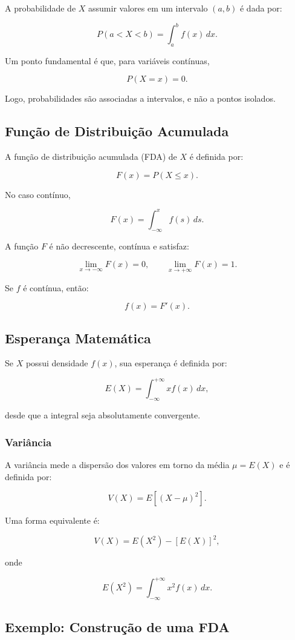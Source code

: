 A probabilidade de $X$ assumir valores em um intervalo $(a,b)$ é dada por:

\[
P(a<X<b)=\int_a^b f(x)\,dx.
\]

Um ponto fundamental é que, para variáveis contínuas,

\[
P(X=x)=0.
\]

Logo, probabilidades são associadas a intervalos, e não a pontos isolados.

\subsection{Função de Distribuição Acumulada}

A função de distribuição acumulada (FDA) de $X$ é definida por:

\[
F(x)=P(X\le x).
\]

No caso contínuo,

\[
F(x)=\int_{-\infty}^{x} f(s)\,ds.
\]

A função $F$ é não decrescente, contínua e satisfaz:

\[
\lim_{x\to -\infty}F(x)=0,
\qquad
\lim_{x\to +\infty}F(x)=1.
\]

Se $f$ é contínua, então:

\[
f(x)=F'(x).
\]

\subsection{Esperança Matemática}

Se $X$ possui densidade $f(x)$, sua esperança é definida por:

\[
E(X)=\int_{-\infty}^{+\infty} x f(x)\,dx,
\]

desde que a integral seja absolutamente convergente.

\subsubsection{Variância}

A variância mede a dispersão dos valores em torno da média
$\mu=E(X)$ e é definida por:

\[
V(X)=E[(X-\mu)^2].
\]

Uma forma equivalente é:

\[
V(X)=E(X^2)-[E(X)]^2,
\]

onde

\[
E(X^2)=\int_{-\infty}^{+\infty} x^2 f(x)\,dx.
\]
\newpage


\subsection*{Exemplo: Construção de uma FDA}

